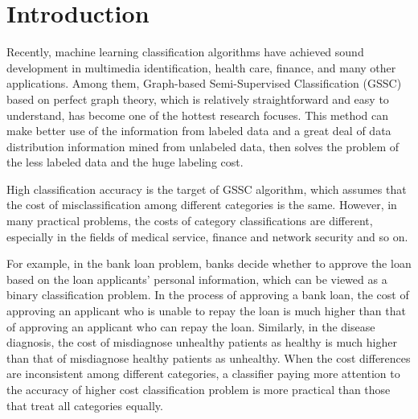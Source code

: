 \documentclass{svjour3}                     %
\begin{document}
\section{Introduction}
\label{intro}


Recently, machine learning classification algorithms have achieved sound development in multimedia identification, health care, finance, and many other applications. Among them, Graph-based Semi-Supervised Classification (GSSC)\cite{zhu2009introduction} based on perfect graph theory, which is relatively straightforward and easy to understand, has become one of the hottest research focuses. This method can make better use of the information from labeled data and a great deal of data distribution information mined from unlabeled data, then solves the problem of the less labeled data and the huge labeling cost.

High classification accuracy is the target of GSSC algorithm, which assumes that the cost of misclassification among different categories is the same. However, in many practical problems,  the costs of category classifications are different, especially in the fields of medical service, finance and network security and so on.

For example, in the bank loan problem, banks decide whether to approve the loan based on the loan applicants' personal information, which can be viewed as a binary classification problem. In the process of approving a bank loan, the cost of approving an applicant who is unable to repay the loan is much higher than that of approving an applicant who can repay the loan. Similarly, in the disease diagnosis, the cost of misdiagnose unhealthy patients as healthy is much higher than that of misdiagnose healthy patients as unhealthy. When the cost differences are inconsistent among different categories, a classifier paying more attention to the accuracy of higher cost classification problem is more practical than those that treat all categories equally.
\end{document}
